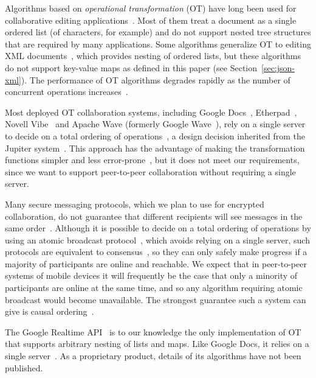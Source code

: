 \documentclass[10pt,journal,compsoc]{IEEEtran}
\begin{document}
Algorithms based on \emph{operational transformation} (OT) have long been used for collaborative editing applications~\cite{Ellis:1989ue,Ressel:1996wx,Sun:1998vf,Nichols:1995fd}. Most of them treat a document as a single ordered list (of characters, for example) and do not support nested tree structures that are required by many applications. Some algorithms generalize OT to editing XML documents~\cite{Davis:2002iv,Ignat:2003jy,Wang:2015vo}, which provides nesting of ordered lists, but these algorithms do not support key-value maps as defined in this paper (see Section~\ref{sec:json-xml}). The performance of OT algorithms degrades rapidly as the number of concurrent operations increases~\cite{Li:2006kd}.

Most deployed OT collaboration systems, including Google Docs~\cite{DayRichter:2010tt}, Etherpad~\cite{Etherpad:2011um}, Novell Vibe~\cite{Spiewak:2010vw} and Apache Wave (formerly Google Wave~\cite{Wang:2015vo}), rely on a single server to decide on a total ordering of operations~\cite{Lemonik:2016wh}, a design decision inherited from the Jupiter system~\cite{Nichols:1995fd}. This approach has the advantage of making the transformation functions simpler and less error-prone~\cite{Imine:2003ks}, but it does not meet our requirements, since we want to support peer-to-peer collaboration without requiring a single server.

Many secure messaging protocols, which we plan to use for encrypted collaboration, do not guarantee that different recipients will see messages in the same order~\cite{Unger:2015kg}. Although it is possible to decide on a total ordering of operations by using an atomic broadcast protocol~\cite{Defago:2004ji}, which avoids relying on a single server, such protocols are equivalent to consensus~\cite{Chandra:1996cp}, so they can only safely make progress if a majority of participants are online and reachable. We expect that in peer-to-peer systems of mobile devices it will frequently be the case that only a minority of participants are online at the same time, and so any algorithm requiring atomic broadcast would become unavailable. The strongest guarantee such a system can give is causal ordering~\cite{Attiya:2015dm}.

The Google Realtime API~\cite{Google:2015vk} is to our knowledge the only implementation of OT that supports arbitrary nesting of lists and maps. Like Google Docs, it relies on a single server~\cite{Lemonik:2016wh}. As a proprietary product, details of its algorithms have not been published.
\end{document}
